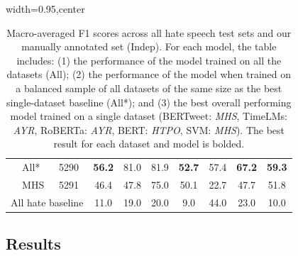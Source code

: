 \begin{table}[ht]
\begin{adjustbox}{width=0.95\textwidth,center}
\begin{tabular}{lll|ccccc|c|c}
    \multicolumn{1}{l|}{}                             & All*        & 5290            
        & \textbf{56.2}            & 81.0                    & 81.9                    & \textbf{52.7}           & 57.4          
        & \textbf{67.2}          & \textbf{59.3}            \\
    \multicolumn{1}{l|}{}                             & MHS         & 5291            
        & 46.4                     & 47.8                    & 75.0                    & 50.1                    & 22.7          
        & 47.7                   & 51.8                     \\ \hline
    \multicolumn{3}{l|}{All hate baseline}      
        & 11.0                & 19.0                   & 20.0                    & 9.0                     & 44.0        
        & 23.0        & 10.0 \\ \hline
    \end{tabular}
    \end{adjustbox}
    
    \caption{Macro-averaged F1 scores across all hate speech test sets and our manually annotated set (Indep). For each model, the table includes:  (1) the performance of the model trained on all the datasets (All); (2) the performance of the model when trained on a balanced sample of all datasets of the same size as the best single-dataset baseline (All*); and (3) the best overall performing model trained on a single dataset (BERTweet: \textit{MHS}, TimeLMs: \textit{AYR}, RoBERTa: \textit{AYR}, BERT: \textit{HTPO}, SVM: \textit{MHS}). The best result for each dataset and model is bolded.}
    \label{tab:grouped_results_combined}
    \end{table}
    
    \clearpage
    

\subsection{Results}


